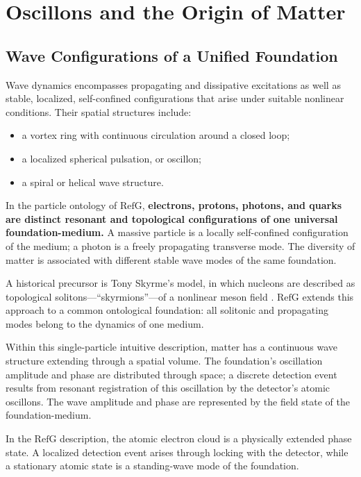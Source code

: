 \documentclass[11pt,a4paper]{article}
\newcommand{\RefG}{\mathrm{RefG}}
\begin{document}
\section{Oscillons and the Origin of Matter}

\subsection{Wave Configurations of a Unified Foundation}

Wave dynamics encompasses propagating and dissipative excitations as well as stable, localized, self-confined configurations that arise under suitable nonlinear conditions. Their spatial structures include:
\begin{itemize}
\item a vortex ring with continuous circulation around a closed loop;
\item a localized spherical pulsation, or oscillon;
\item a spiral or helical wave structure.
\end{itemize}

In the particle ontology of $\RefG$, \textbf{electrons, protons, photons, and quarks are distinct resonant and topological configurations of one universal foundation-medium.} A massive particle is a locally self-confined configuration of the medium; a photon is a freely propagating transverse mode. The diversity of matter is associated with different stable wave modes of the same foundation.

A historical precursor is Tony Skyrme's model, in which nucleons are described as topological solitons---``skyrmions''---of a nonlinear meson field \citep{skyrme1961}. $\RefG$ extends this approach to a common ontological foundation: all solitonic and propagating modes belong to the dynamics of one medium.

Within this single-particle intuitive description, matter has a continuous wave structure extending through a spatial volume. The foundation's oscillation amplitude and phase are distributed through space; a discrete detection event results from resonant registration of this oscillation by the detector's atomic oscillons. The wave amplitude and phase are represented by the field state of the foundation-medium.

In the $\RefG$ description, the atomic electron cloud is a physically extended phase state. A localized detection event arises through locking with the detector, while a stationary atomic state is a standing-wave mode of the foundation.
\end{document}
